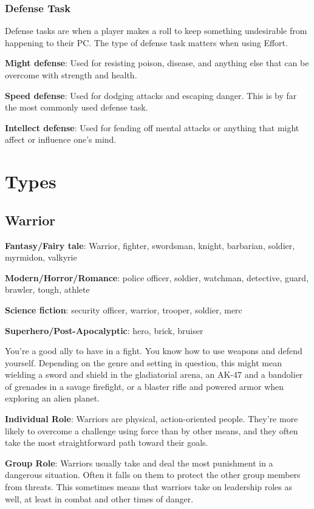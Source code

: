 \begin{multicols}{2}
\subsection{Defense Task}

Defense tasks are when a player makes a roll to keep something undesirable from happening to their PC. The type of defense task matters when using Effort.

\textbf{Might defense}: Used for resisting poison, disease, and anything else that can be overcome with strength and health.

\textbf{Speed defense}: Used for dodging attacks and escaping danger. This is by far the most commonly used defense task.

\textbf{Intellect defense}: Used for fending off mental attacks or anything that might affect or influence one’s mind.

\chapter{Types}

\section{Warrior}

\textbf{Fantasy/Fairy tale}: Warrior, fighter, swordsman, knight, barbarian, soldier, myrmidon, valkyrie

\textbf{Modern/Horror/Romance}: police officer, soldier, watchman, detective, guard, brawler, tough, athlete

\textbf{Science fiction}: security officer, warrior, trooper, soldier, merc

\textbf{Superhero/Post-Apocalyptic}: hero, brick, bruiser

You’re a good ally to have in a fight. You know how to use weapons and defend yourself. Depending on the genre and setting in question, this might mean wielding a sword and shield in the gladiatorial arena, an AK-47 and a bandolier of grenades in a savage firefight, or a blaster rifle and powered armor when exploring an alien planet.

\textbf{Individual Role}: Warriors are physical, action-oriented people. They’re more likely to overcome a challenge using force than by other means, and they often take the most straightforward path toward their goals. 

\textbf{Group Role}: Warriors usually take and deal the most punishment in a dangerous situation. Often it falls on them to protect the other group members from threats. This sometimes means that warriors take on leadership roles as well, at least in combat and other times of danger.


\end{multicols}
